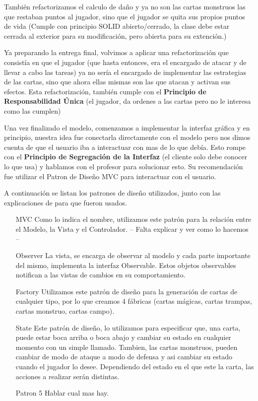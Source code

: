 También refactorizamos el calculo de daño y ya no son las cartas monstruos las que restaban puntos al jugador, sino que el jugador se quita sus propios puntos de vida (Cumple con principio SOLID abierto/cerrado, la clase debe estar cerrada al exterior para su modificación, pero abierta para su extención.)


Ya preparando la entrega final, volvimos a aplicar una refactorización que consistía en que el jugador (que hasta entonces, era el encargado de atacar y de llevar a cabo las tareas) ya no sería el encargado de implementar las estrategias de las cartas, sino que ahora ellas mismas son las que atacan y activan sus efectos. Esta refactorización, también cumple con el \textbf{Principio de Responsabilidad Única} (el jugador, da ordenes a las cartas pero no le interesa como las cumplen) 


Una vez finalizado el modelo, comenzamos a implementar la interfaz gráfica y en principio, nuestra idea fue conectarla directamente con el modelo pero nos dimos cuenta de que el usuario iba a interactuar con mas de lo que debía. Esto rompe con el \textbf{Principio de Segregación de la Interfaz} (el cliente solo debe conocer lo que usa) y hablamos con el profesor para solucionar esto. Su recomendación fue utilizar el Patron de Diseño MVC para interactuar con el usuario.


A continuación se listan los patrones de diseño utilizados, junto con las explicaciones de para que fueron usados.


\begin{itemize}

\item [MVC] Como lo indica el nombre, utilizamos este patrón para la relación entre el Modelo, la Vista y el Controlador. -- Falta explicar y ver como lo hacemos --

\item [Observer] La vista, se encarga de observar al modelo y cada parte importante del mismo, implementa la interfaz Observable. Estos objetos observables notifican a las vistas de cambios en su comportamiento. 

\item [Factory] Utilizamos este patrón de diseño para la generación de cartas de cualquier tipo, por lo que creamos 4 fábricas (cartas mágicas, cartas trampas, cartas monstruo, cartas campo).

\item [State] Este patrón de diseño, lo utilizamos para especificar que, una carta, puede estar boca arriba o boca abajo y cambiar su estado en cualquier momento con un simple llamado. Tambien, las cartas monstruos, pueden cambiar de modo de ataque a modo de defensa y asi cambiar su estado cuando el jugador lo desee. Dependiendo del estado en el que este la carta, las acciones a realizar serán distintas.  

\item [Patron 5] Hablar cual mas hay.

\end{itemize}


